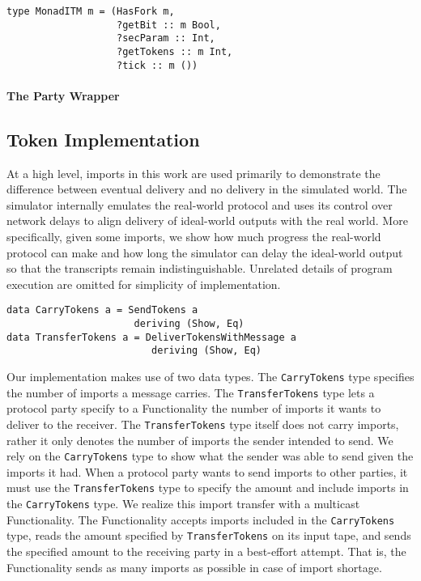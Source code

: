 \begin{lstlisting}
type MonadITM m = (HasFork m,
                   ?getBit :: m Bool,
                   ?secParam :: Int,
                   ?getTokens :: m Int,
                   ?tick :: m ())
\end{lstlisting}

\paragraph{The Party Wrapper}

\subsection{Token Implementation}
At a high level, imports in this work are used primarily to demonstrate the difference between eventual delivery and no delivery in the simulated world. The simulator internally emulates the real-world protocol and uses its control over network delays to align delivery of ideal-world outputs with the real world. More specifically, given some imports, we show how much progress the real-world protocol can make and how long the simulator can delay the ideal-world output so that the transcripts remain indistinguishable. Unrelated details of program execution are omitted for simplicity of implementation.

\begin{lstlisting}
data CarryTokens a = SendTokens a 
                      deriving (Show, Eq)
data TransferTokens a = DeliverTokensWithMessage a 
                         deriving (Show, Eq)
\end{lstlisting}

Our implementation makes use of two data types. The \texttt{CarryTokens} type specifies the number of imports a message carries. The \texttt{TransferTokens} type lets a protocol party specify to a Functionality the number of imports it wants to deliver to the receiver. The \texttt{TransferTokens} type itself does not carry imports, rather it only denotes the number of imports the sender intended to send. We rely on the \texttt{CarryTokens} type to show what the sender was able to send given the imports it had. When a protocol party wants to send imports to other parties, it must use the \texttt{TransferTokens} type to specify the amount and include imports in the \texttt{CarryTokens} type. We realize this import transfer with a multicast Functionality. The Functionality accepts imports included in the \texttt{CarryTokens} type, reads the amount specified by \texttt{TransferTokens} on its input tape, and sends the specified amount to the receiving party in a best-effort attempt. That is, the Functionality sends as many imports as possible in case of import shortage.

